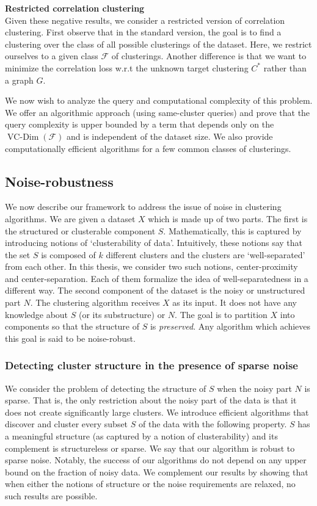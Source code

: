 \documentclass[12pt]{article}
\newcommand{\mc}{\mathcal}
\DeclareMathOperator{\vcdim}{VC-Dim}
\begin{document}
\noindent\textbf{\small Restricted correlation clustering}\\
Given these negative results, we consider a restricted version of correlation clustering. First observe that in the standard version, the goal is to find a clustering over the class of all possible clusterings of the dataset. Here, we restrict ourselves to a given class $\mc F$ of clusterings. Another difference is that we want to minimize the correlation loss w.r.t the unknown target clustering $C^*$ rather than a graph $G$. 

We now wish to analyze the query and computational complexity of this problem. We offer an algorithmic approach (using same-cluster queries) and prove that the query complexity is upper bounded by a term that depends only on the $\vcdim(\mc F)$ and is independent of the dataset size. We also provide computationally efficient algorithms for a few common classes of clusterings. 
 
\subsection{Noise-robustness}
We now describe our framework to address the issue of noise in clustering algorithms. We are given a dataset $X$ which is made up of two parts. The first is the structured or clusterable component $S$. Mathematically, this is captured by introducing notions of `clusterability of data'. Intuitively, these notions say that the set $S$ is composed of $k$ different clusters and the clusters are `well-separated' from each other. In this thesis, we consider two such notions, center-proximity and center-separation. Each of them formalize the idea of well-separatedness in a different way. The second component of the dataset is the noisy or unstructured part $N$. The clustering algorithm receives $X$ as its input. It does not have any knowledge about $S$ (or its substructure) or $N$. The goal is to partition $X$ into components so that the structure of $S$ is \textit{preserved}. Any algorithm which achieves this goal is said to be noise-robust. 

\subsubsection*{Detecting cluster structure in the presence of sparse noise}
We consider the problem of detecting the structure of $S$ when the noisy part $N$ is sparse. That is, the only restriction about the noisy part of the data is that it does not create significantly large clusters. We introduce efficient algorithms that discover and cluster every subset $S$ of the data with the following property. $S$ has a meaningful structure (as captured by a notion of clusterability) and its complement is structureless or sparse. We say that our algorithm is robust to sparse noise. Notably, the success of our algorithms do not depend on any upper bound on the fraction of noisy data. We complement our results by showing that when either the notions of structure or the noise requirements are relaxed, no such results are possible.
\end{document}
